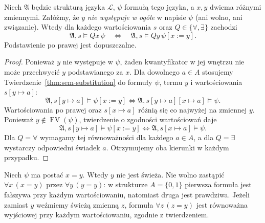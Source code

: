 \begin{twierdzenie}
\label{thm:sem-alpha-renaming-xlv}
Niech $\mathfrak A$ będzie strukturą języka $\mathcal L$,
$\psi$ formułą tego języka, a $x,y$ dwiema różnymi
zmiennymi. Załóżmy, że $y$ \emph{nie występuje w ogóle}
w napisie $\psi$ (ani wolno, ani związanie).
Wtedy dla każdego wartościowania $s$ oraz
$Q\in\{\forall,\exists\}$ zachodzi
\[
\mathfrak A,s\models Qx\,\psi
\quad\Longleftrightarrow\quad
\mathfrak A,s\models Qy\,\psi[x:=y].
\]
Podstawienie po prawej jest dopuszczalne.
\end{twierdzenie}
\begin{proof}
Ponieważ $y$ nie występuje w $\psi$, żaden kwantyfikator
w jej wnętrzu nie może przechwycić $y$ podstawianego za $x$.
Dla dowolnego $a\in A$ stosujemy
Twierdzenie~\ref{thm:sem-substitution} do formuły $\psi$,
termu $y$ i wartościowania $s[y\mapsto a]$:
\[
\mathfrak A,s[y\mapsto a]\models\psi[x:=y]
\iff
\mathfrak A,s[y\mapsto a][x\mapsto a]\models\psi.
\]
Wartościowania po prawej oraz $s[x\mapsto a]$ różnią się
co najwyżej na zmiennej $y$. Ponieważ
$y\notin\operatorname{FV}(\psi)$, twierdzenie o zgodności
wartościowań daje
\[
\mathfrak A,s[y\mapsto a]\models\psi[x:=y]
\iff
\mathfrak A,s[x\mapsto a]\models\psi.
\]
Dla $Q=\forall$ wymagamy tej równoważności dla każdego
$a\in A$, a dla $Q=\exists$ wystarczy odpowiedni
świadek $a$. Otrzymujemy oba kierunki w każdym przypadku.
\end{proof}
\begin{przyklad}
Niech $\psi$ ma postać $x=y$. Wtedy $y$ nie jest świeża.
Nie wolno zastąpić $\forall x\,(x=y)$ przez
$\forall y\,(y=y)$: w strukturze
$A=\{0,1\}$ pierwsza formuła jest fałszywa przy każdym
wartościowaniu, natomiast druga jest prawdziwa.
Jeżeli zamiast $y$ weźmiemy świeżą zmienną $z$,
formuła $\forall z\,(z=y)$ jest równoważna wyjściowej
przy każdym wartościowaniu, zgodnie z twierdzeniem.
\end{przyklad}

